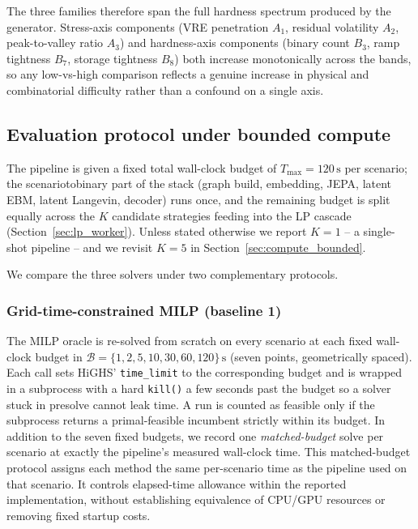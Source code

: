 \documentclass{article}
\begin{document}
The three families therefore span the full hard\-ness spectrum produced by the generator. Stress-axis components (VRE penetration $A_1$, residual volatility $A_2$, peak-to-valley ratio $A_3$) and hardness-axis components (binary count $B_3$, ramp tightness $B_7$, storage tightness $B_8$) both increase monotonically across the bands, so any low-vs-high comparison reflects a genuine increase in physical and combinatorial difficulty rather than a confound on a single axis.

\subsection{Evaluation protocol under bounded compute}
\label{sec:eval_protocol}

The pipeline is given a fixed total wall-clock budget of $T_{\max} = 120\,\mathrm{s}$ per scenario; the scenario\-to\-binary part of the stack (graph build, embedding, JEPA, latent EBM, latent Langevin, decoder) runs once, and the remaining budget is split equally across the $K$ candidate strategies feeding into the LP cascade (Section~\ref{sec:lp_worker}). Unless stated otherwise we report \emph{$K=1$} -- a single-shot pipeline -- and we revisit $K=5$ in Section~\ref{sec:compute_bounded}.

We compare the three solvers under two complementary protocols.

\subsubsection{Grid-time-constrained MILP (baseline 1)}
\label{sec:protocol_milp}
The MILP oracle is re-solved from scratch on every scenario at each fixed wall-clock budget in $\mathcal{B} = \{1, 2, 5, 10, 30, 60, 120\}\,\mathrm{s}$ (seven points, geometrically spaced). Each call sets HiGHS' \texttt{time\_limit} to the corresponding budget and is wrapped in a subprocess with a hard \texttt{kill()} a few seconds past the budget so a solver stuck in presolve cannot leak time. A run is counted as feasible only if the subprocess returns a primal-feasible incumbent strictly within its budget. In addition to the seven fixed budgets, we record one \emph{matched-budget} solve per scenario at exactly the pipeline's measured wall-clock time. This matched-budget protocol assigns each method the same per-scenario time as the pipeline used on that scenario. It controls elapsed-time allowance within the reported implementation, without establishing equivalence of CPU/GPU resources or removing fixed startup costs.
\end{document}

